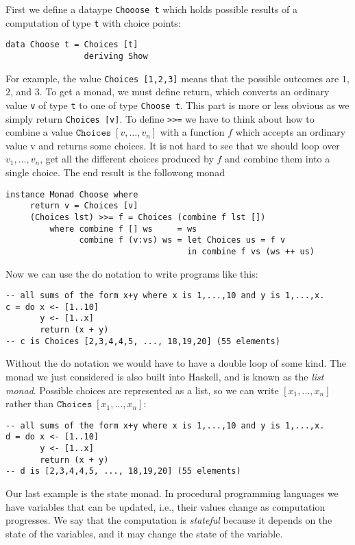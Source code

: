 \documentclass[a4paper,10pt]{article}
\newcommand{\cc}[1]{\lstinline{#1}}
\begin{document}
First we define a dataype \cc{Chooose t} which holds possible results of a computation of type \cc{t} with choice points:
%
\begin{lstlisting}
data Choose t = Choices [t]
                deriving Show
\end{lstlisting}
%
For example, the value \cc{Choices [1,2,3]} means that the possible outcomes are $1$, $2$, and $3$. To get a monad,
we must define return, which converts an ordinary value \cc{v} of type \cc{t} to one of type \cc{Choose t}. This part is more or less obvious as we simply return \cc{Choices [v]}.
%
To define \cc{>>=} we have to think about how to combine a value $\mathtt{Choices}\;[v, \ldots, v_n]$ with a function $f$ which accepts an ordinary value v and returns some choices. It is not hard to see that we should loop over $v_1, ..., v_n$, get all the different choices produced by $f$ and combine them into a single choice. The end result is the followong monad
%
\begin{lstlisting}
instance Monad Choose where
     return v = Choices [v]
     (Choices lst) >>= f = Choices (combine f lst [])
         where combine f [] ws     = ws
               combine f (v:vs) ws = let Choices us = f v
                                     in combine f vs (ws ++ us)
\end{lstlisting}
%
Now we can use the do notation to write programs like this:
%
\begin{lstlisting}
-- all sums of the form x+y where x is 1,...,10 and y is 1,...,x.
c = do x <- [1..10]
       y <- [1..x]
       return (x + y)
-- c is Choices [2,3,4,4,5, ..., 18,19,20] (55 elements)
\end{lstlisting}
%
Without the do notation we would have to have a double loop of some kind. The monad we just considered is also built into Haskell, and is known as the \emph{list monad}. Possible choices are represented as a list, so we can write $[x_1, \ldots, x_n]$ rather than $\mathtt{Choices}\; [x_1, \ldots, x_n]$:
%
\begin{lstlisting}
-- all sums of the form x+y where x is 1,...,10 and y is 1,...,x.
d = do x <- [1..10]
       y <- [1..x]
       return (x + y)
-- d is [2,3,4,4,5, ..., 18,19,20] (55 elements)
\end{lstlisting}

Our last example is the state monad. In procedural programming languages we have variables that can be updated, i.e., their values change as computation progresses. We say that the computation is \emph{stateful} because it depends on the state of the variables, and it may change the state of the variable.
\end{document}
